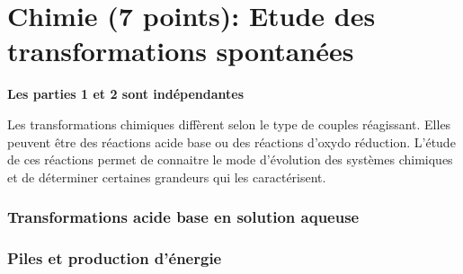 \part{Chimie (7 points): Etude des transformations spontanées}

\begin{center}
    \textbf{Les parties 1 et 2 sont indépendantes}
\end{center}
Les transformations chimiques diffèrent selon le type de couples réagissant.
Elles peuvent être des réactions acide base ou des réactions d'oxydo réduction.
L'étude de ces réactions permet de connaitre le mode d'évolution des systèmes
chimiques et de déterminer certaines grandeurs qui les caractérisent.

\section{Transformations acide base en solution aqueuse}


\section{Piles et production d'énergie}


